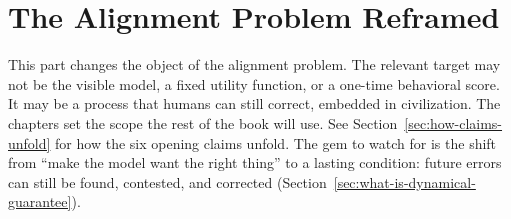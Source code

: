 \part{The Alignment Problem Reframed}

This part changes the object of the alignment problem.
The relevant target may not be the visible model, a fixed utility function, or a one-time behavioral score.
It may be a process that humans can still correct, embedded in civilization.
The chapters set the scope the rest of the book will use.
See Section~\ref{sec:how-claims-unfold} for how the six opening claims unfold.
The gem to watch for is the shift from ``make the model want the right thing'' to a lasting condition: future errors can still be found, contested, and corrected (Section~\ref{sec:what-is-dynamical-guarantee}).






